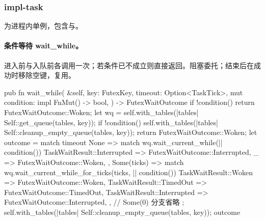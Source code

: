 
\subsubsection{impl-task}

为进程内单例，包含与。

\paragraph{条件等待 wait\_while。}
进入前与入队前各调用一次；若条件已不成立则直接返回。阻塞委托；结束后在成功时移除空键，复用。

\begin{rustcode}
pub fn wait_while(
    &self,
    key: FutexKey,
    timeout: Option<TaskTick>,
    mut condition: impl FnMut() -> bool,
) -> FutexWaitOutcome {
    if !condition() {
        return FutexWaitOutcome::Woken;
    }
    let wq = self.with_tables(|tables| Self::get_queue(tables, key));
    if !condition() {
        self.with_tables(|tables| Self::cleanup_empty_queue(tables, key));
        return FutexWaitOutcome::Woken;
    }
    let outcome = match timeout {
        None => match wq.wait_current_while(|| condition()) {
            TaskWaitResult::Interrupted => FutexWaitOutcome::Interrupted,
            _ => FutexWaitOutcome::Woken,
        },
        Some(ticks) => match wq.wait_current_while_for_ticks(ticks, || condition()) {
            TaskWaitResult::Woken => FutexWaitOutcome::Woken,
            TaskWaitResult::TimedOut => FutexWaitOutcome::TimedOut,
            TaskWaitResult::Interrupted => FutexWaitOutcome::Interrupted,
        },
        // Some(0) 分支省略
    };
    self.with_tables(|tables| Self::cleanup_empty_queue(tables, key));
    outcome
}
\end{rustcode}

